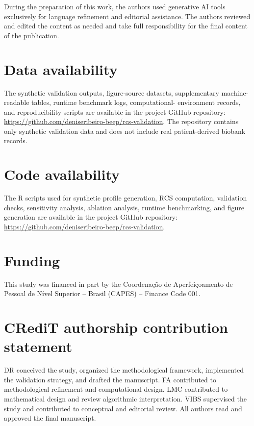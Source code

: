 \documentclass[preprint,12pt]{elsarticle}
\begin{document}
During the preparation of this work, the authors used generative AI tools exclusively for language refinement and editorial assistance. The 
authors reviewed and edited the content as needed and take full responsibility for the final content of the publication.

\section*{Data availability}

The synthetic validation outputs, figure-source datasets, supplementary machine-readable tables, runtime benchmark logs, computational-
environment records, and reproducibility scripts are available in the project GitHub repository: \url{https://github.com/deniseribeiro-beep/rcs-validation}. The repository contains only synthetic validation data and does not include real patient-derived biobank records.

\section*{Code availability}

The \textsf{R} scripts used for synthetic profile generation, RCS computation, validation checks, sensitivity analysis, ablation analysis, runtime benchmarking, and figure generation are 
available in the project GitHub repository: \url{https://github.com/deniseribeiro-beep/rcs-validation}.

\section*{Funding}

This study was financed in part by the Coordenação de Aperfeiçoamento de Pessoal de Nível Superior – Brasil (CAPES) – Finance Code 001.

\section*{CRediT authorship contribution statement}

DR conceived the study, organized the methodological framework, implemented the validation strategy, and drafted the manuscript. FA contributed to methodological refinement and computational design. LMC contributed to mathematical design and review algorithmic interpretation. VIBS supervised the study and contributed to conceptual and editorial review. All authors 
read and approved the final manuscript.
\end{document}
